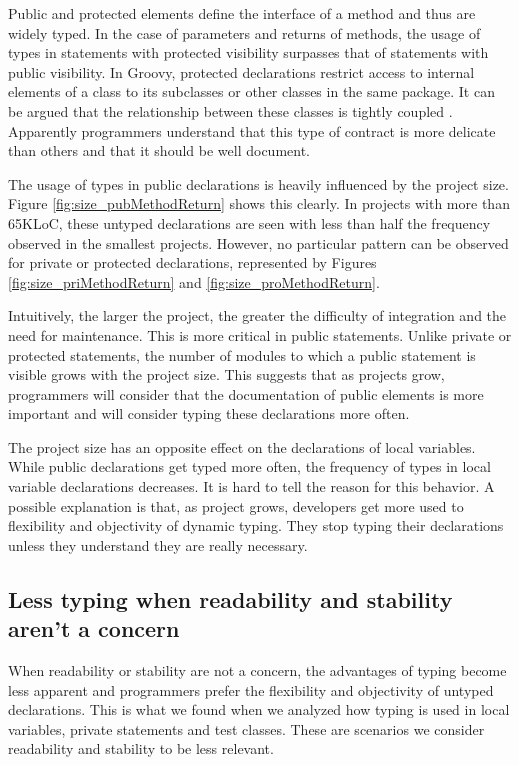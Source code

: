 \documentclass[preprint]{sigplanconf}
\begin{document}
Public and protected elements define the interface of a method and thus are widely typed.
In the case of parameters and returns of methods, the usage of types in statements with protected visibility  surpasses that of statements with public visibility.
In Groovy, protected declarations restrict access to internal elements of a class to its subclasses or other classes in the same package.
It can be argued that the relationship between these classes is tightly coupled \cite{Eder94}.
Apparently programmers understand that this type of contract is more delicate than others and that it should be well document.

The usage of types in public declarations is heavily influenced by the project size.
Figure \ref{fig:size_pubMethodReturn} shows this clearly.
In projects with more than 65KLoC, these untyped declarations are seen with less than half the frequency observed in the smallest projects.
However, no particular pattern can be observed for private or protected declarations, represented by Figures \ref{fig:size_priMethodReturn} and \ref{fig:size_proMethodReturn}.

Intuitively, the larger the project, the greater the difficulty of integration and the need for maintenance.
This is more critical in public statements.
Unlike private or protected statements, the number of modules to which a public statement is visible grows with the project size.
This suggests that as projects grow, programmers will consider that the documentation of public elements is more important and will consider typing these declarations more often.

The project size has an opposite effect on the declarations of local variables.
While public declarations get typed more often, the frequency of types in local variable declarations decreases.
It is hard to tell the reason for this behavior.
A possible explanation is that, as project grows, developers get more used to flexibility and objectivity of dynamic typing.
They stop typing their declarations unless they understand they are really necessary.

\subsection{Less typing when readability and stability aren't a concern\label{discussion-q2}}
When readability or stability are not a concern, the advantages of typing become less apparent and  programmers prefer the flexibility and objectivity of untyped declarations.
This is what we found when we analyzed how typing is used in local variables, private statements and test classes.
These are scenarios we consider readability and stability to be less relevant.
\end{document}
